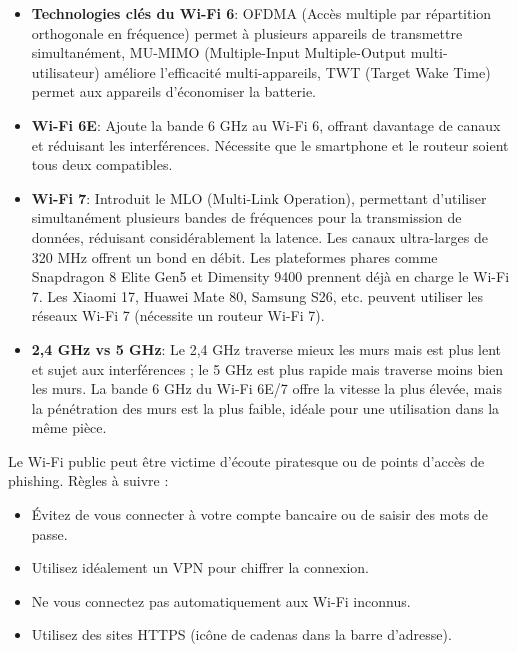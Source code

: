 \begin{itemize}
  \item \textbf{Technologies clés du Wi-Fi 6}: OFDMA (Accès multiple par répartition orthogonale en fréquence) permet à plusieurs appareils de transmettre simultanément, MU-MIMO (Multiple-Input Multiple-Output multi-utilisateur) améliore l'efficacité multi-appareils, TWT (Target Wake Time) permet aux appareils d'économiser la batterie.
  \item \textbf{Wi-Fi 6E}: Ajoute la bande 6 GHz au Wi-Fi 6, offrant davantage de canaux et réduisant les interférences. Nécessite que le smartphone et le routeur soient tous deux compatibles.
  \item \textbf{Wi-Fi 7}: Introduit le MLO (Multi-Link Operation), permettant d'utiliser simultanément plusieurs bandes de fréquences pour la transmission de données, réduisant considérablement la latence. Les canaux ultra-larges de 320 MHz offrent un bond en débit. Les plateformes phares comme Snapdragon 8 Elite Gen5 et Dimensity 9400 prennent déjà en charge le Wi-Fi 7. Les Xiaomi 17, Huawei Mate 80, Samsung S26, etc. peuvent utiliser les réseaux Wi-Fi 7 (nécessite un routeur Wi-Fi 7).
  \item \textbf{2,4 GHz vs 5 GHz}: Le 2,4 GHz traverse mieux les murs mais est plus lent et sujet aux interférences ; le 5 GHz est plus rapide mais traverse moins bien les murs. La bande 6 GHz du Wi-Fi 6E/7 offre la vitesse la plus élevée, mais la pénétration des murs est la plus faible, idéale pour une utilisation dans la même pièce.
\end{itemize}


Le Wi-Fi public peut être victime d'écoute piratesque ou de points d'accès de phishing. Règles à suivre :

\begin{itemize}
  \item Évitez de vous connecter à votre compte bancaire ou de saisir des mots de passe.
  \item Utilisez idéalement un VPN pour chiffrer la connexion.
  \item Ne vous connectez pas automatiquement aux Wi-Fi inconnus.
  \item Utilisez des sites HTTPS (icône de cadenas dans la barre d'adresse).
\end{itemize}


